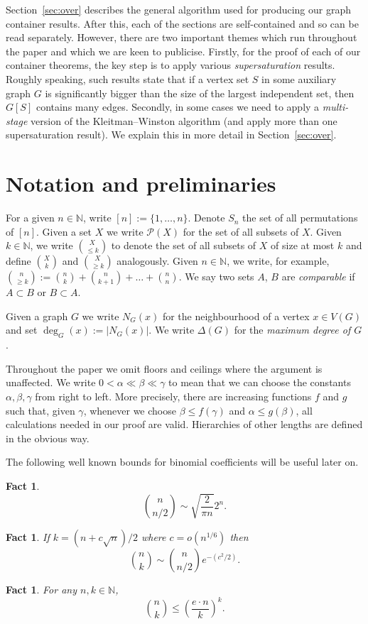 \documentclass[11pt]{article}
\newtheorem{fact}[theorem]{Fact}
\numberwithin{equation}{section}
\begin{document}
Section~\ref{sec:over} describes the general algorithm used for producing our graph container results. After this, each of the sections are self-contained and so can be read separately. 
However, there are two important themes which run throughout the paper and which we are keen to publicise. Firstly, for the proof of each of our container theorems, the key step is to apply various \emph{supersaturation} results. Roughly speaking, such results
state that if a vertex set $S$ in some auxiliary graph $G$ is significantly bigger than the size of the largest independent set, then $G[S]$ contains many edges.
Secondly, in some cases we need to apply a \emph{multi-stage} version of the Kleitman--Winston algorithm (and apply more than one supersaturation result). We explain this in more detail in Section~\ref{sec:over}.

\section{Notation and preliminaries}

For a given $n \in \mathbb N$, write $[n]:=\{1, \dots, n\}$. %
Denote $S_n$ the set of all permutations of $[n]$. Given a set $X$ we write $\mathcal P(X)$ for the set of all subsets of $X$.
Given  $k \in \mathbb N$, we write $\binom{X}{\leq k}$ to denote the set of all subsets of $X$ of size at most $k$ and define $\binom{X}{ k}$ and $\binom{X}{\geq k}$ analogously.
Given  $n\in \mathbb N$, we write, for example, $\binom{n}{\geq k}:=\binom{n}{ k}+\binom{n}{ k+1}+\dots+ \binom{n}{ n}$.
We say two sets $A$, $B$ are \emph{comparable} if $A \subset B$ or $B \subset A$. 

Given a graph $G$ we write $N_G(x)$ for the neighbourhood of a vertex $x \in V(G)$ and set $\deg _G (x):=|N_G (x)|$. We write $\Delta(G)$ for the \emph{maximum degree of $G$}.

Throughout the paper we omit floors and ceilings where the argument is unaffected. We write $0<\alpha \ll \beta \ll \gamma$ to mean that we can choose the constants
$\alpha, \beta, \gamma$ from right to left. More
precisely, there are increasing functions $f$ and $g$ such that, given
$\gamma$, whenever we choose  $\beta \leq f(\gamma)$ and $\alpha \leq g(\beta)$, all
calculations needed in our proof are valid. 
Hierarchies of other lengths are defined in the obvious way.


The following  well known bounds for  binomial coefficients will be useful later on.
\begin{fact}\label{fact1}
$$\binom{n}{n/2} \sim \sqrt{\frac{2}{\pi n}} 2^n.$$
\end{fact}
\begin{fact}\label{fact2} If $k=(n+c\sqrt{n})/2$ where $c=o(n^{1/6})$ then
$$\binom{n}{k} \sim \binom{n}{n/2} e^{-(c^2/2)}.$$
\end{fact}
\begin{fact}\label{fact3} For any $n,k \in \mathbb N$,
$$\binom{n}{k} \leq \left  ( \frac{e \cdot n}{k} \right  ) ^k.$$
\end{fact}
\end{document}
